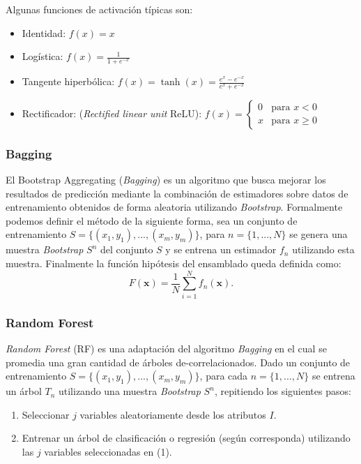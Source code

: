 \documentclass[spanish]{article}
\begin{document}
          Algunas funciones de activación típicas son:
          \begin{itemize}
            \item Identidad: $f(x)=x$
            \item Logística: $f(x)=\frac{1}{1+e^{-x}}$
            \item Tangente hiperbólica: $f(x)=\tanh(x)=\frac{e^x - e^{-x}}{e^x + e^{-x}}$
            \item Rectificador: (\emph{Rectified linear unit} ReLU): 
              $f(x)=\begin{cases} 0 & \text{para } x < 0 \\ x & \text{para } x \geq 0 \end{cases}$ 
          \end{itemize}
              
            
        \subsubsection{Bagging}
        
          El Bootstrap Aggregating (\emph{Bagging}) \cite{breiman1996bagging} es un algoritmo que busca mejorar los resultados 
          de predicción mediante la combinación de estimadores sobre datos de entrenamiento obtenidos 
          de forma aleatoria utilizando \emph{Bootstrap}. Formalmente podemos definir el método de la 
          siguiente forma, sea un conjunto de entrenamiento $S=\{(x_1, y_1), ...,  (x_m, y_m)\}$, para 
          $n=\{1, ..., N\}$ se genera una muestra \emph{Bootstrap} $S^n$ del conjunto $S$ y se entrena 
          un estimador $f_n$ utilizando esta muestra. Finalmente la función hipótesis del ensamblado 
          queda definida como:
          \begin{equation}
              F(\textbf{x}) = \frac1N \sum_{i=1}^N f_n(\textbf{x}).
          \end{equation}
                
                
        \subsubsection{Random Forest}
        
          \emph{Random Forest} (RF) \cite{breiman2001random} es una adaptación del algoritmo \emph{Bagging} en el cual se promedia 
          una gran cantidad de árboles de-correlacionados. Dado un conjunto de entrenamiento 
          $S=\{(x_1, y_1), ..., (x_m, y_m)\}$, para cada $n=\{1, ..., N\}$ se entrena un árbol $T_n$ 
          utilizando una muestra \emph{Bootstrap} $S^n$, repitiendo los siguientes pasos:
          \begin{enumerate}
            \item Seleccionar $j$ variables aleatoriamente desde los atributos $I$.
            \item Entrenar un árbol de clasificación o regresión (según corresponda) utilizando las 
              $j$ variables seleccionadas en (1).
          \end{enumerate}
          
\end{document}
